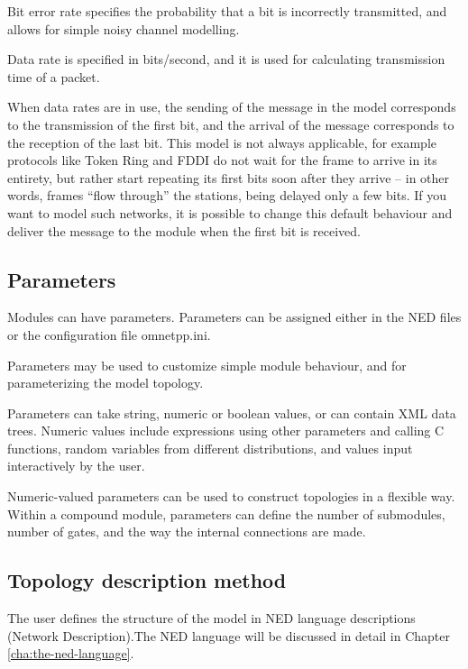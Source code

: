 Bit error rate specifies the probability that a bit is incorrectly
transmitted, and allows for simple noisy channel modelling.

Data rate is specified in bits/second, and it is used for calculating
transmission time of a packet.

When data rates are in use, the sending of the message in the model
corresponds to the transmission of the first bit, and
the arrival of the message corresponds to the reception
of the last bit. This model is not always applicable,
for example protocols like Token Ring and FDDI do not wait
for the frame to arrive in its entirety, but rather start repeating
its first bits soon after they arrive -- in other words,
frames ``flow through'' the stations, being delayed only a few bits.
If you want to model such networks, it is possible to change this default
behaviour and deliver the message to the module when the first bit is
received.



\subsection{Parameters}

Modules can have parameters. Parameters can be assigned either
in the NED files or the configuration file omnetpp.ini.

Parameters may be used to customize simple module behaviour,
and for parameterizing the model topology.

Parameters can take string, numeric or boolean values, or can
contain XML data trees. Numeric values include expressions using
other parameters and calling C functions, random variables from
different distributions, and values input interactively by the user.

Numeric-valued parameters can be used to construct topologies in a
flexible way. Within a compound module, parameters can define the
number of submodules, number of gates, and the way the internal
connections are made.


\subsection{Topology description method}
The user defines the structure of the model in NED language descriptions
(Network Description).The NED language will be discussed in detail
in Chapter \ref{cha:the-ned-language}.


